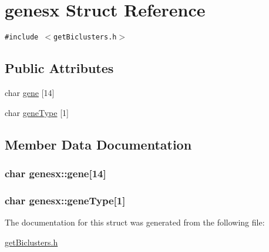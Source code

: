 \hypertarget{structgenesx}{
\section{genesx Struct Reference}
\label{structgenesx}
}
{\tt \#include $<$getBiclusters.h$>$}

\subsection*{Public Attributes}
\begin{CompactItemize}
\item 
char \hyperlink{structgenesx_b5c26ee97ae3054538f3ee1c29f2193a}{gene} \mbox{[}14\mbox{]}
\item 
char \hyperlink{structgenesx_43420fea6a71656562ff202a0279e4ea}{geneType} \mbox{[}1\mbox{]}
\end{CompactItemize}


\subsection{Member Data Documentation}
\hypertarget{structgenesx_b5c26ee97ae3054538f3ee1c29f2193a}{
\subsubsection[{gene}]{\setlength{\rightskip}{0pt plus 5cm}char {\bf genesx::gene}\mbox{[}14\mbox{]}}}
\label{structgenesx_b5c26ee97ae3054538f3ee1c29f2193a}


\hypertarget{structgenesx_43420fea6a71656562ff202a0279e4ea}{
\subsubsection[{geneType}]{\setlength{\rightskip}{0pt plus 5cm}char {\bf genesx::geneType}\mbox{[}1\mbox{]}}}
\label{structgenesx_43420fea6a71656562ff202a0279e4ea}




The documentation for this struct was generated from the following file:\begin{CompactItemize}
\item 
\hyperlink{getBiclusters_8h}{getBiclusters.h}\end{CompactItemize}
